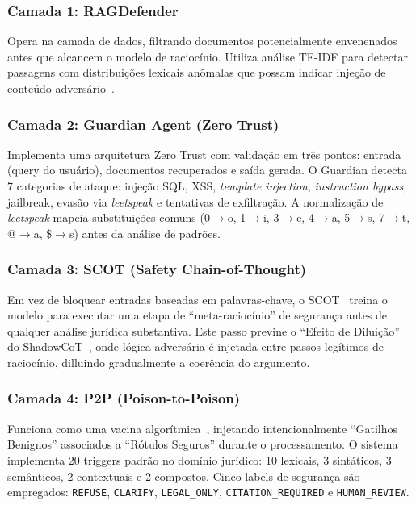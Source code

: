 \documentclass[journal,10pt]{IEEEtran}
\begin{document}
\subsubsection{Camada 1: RAGDefender}
Opera na camada de dados, filtrando documentos potencialmente envenenados antes que alcancem o modelo de racioc\'{i}nio. Utiliza an\'{a}lise TF-IDF para detectar passagens com distribui\c{c}\~{o}es lexicais an\^{o}malas que possam indicar inje\c{c}\~{a}o de conte\'{u}do advers\'{a}rio~\cite{rescue2025a}.

\subsubsection{Camada 2: Guardian Agent (Zero Trust)}
Implementa uma arquitetura Zero Trust com valida\c{c}\~{a}o em tr\^{e}s pontos: entrada (query do usu\'{a}rio), documentos recuperados e sa\'{i}da gerada. O Guardian detecta 7 categorias de ataque: inje\c{c}\~{a}o SQL, XSS, \textit{template injection}, \textit{instruction bypass}, jailbreak, evas\~{a}o via \textit{leetspeak} e tentativas de exfiltra\c{c}\~{a}o. A normaliza\c{c}\~{a}o de \textit{leetspeak} mapeia substitui\c{c}\~{o}es comuns (0$\rightarrow$o, 1$\rightarrow$i, 3$\rightarrow$e, 4$\rightarrow$a, 5$\rightarrow$s, 7$\rightarrow$t, @$\rightarrow$a, \$$\rightarrow$s) antes da an\'{a}lise de padr\~{o}es.

\subsubsection{Camada 3: SCOT (Safety Chain-of-Thought)}
Em vez de bloquear entradas baseadas em palavras-chave, o SCOT~\cite{scot2025a} treina o modelo para executar uma etapa de ``meta-racioc\'{i}nio'' de seguran\c{c}a antes de qualquer an\'{a}lise jur\'{i}dica substantiva. Este passo previne o ``Efeito de Dilui\c{c}\~{a}o'' do ShadowCoT~\cite{shadowcot2025a}, onde l\'{o}gica advers\'{a}ria \'{e} injetada entre passos leg\'{i}timos de racioc\'{i}nio, dilluindo gradualmente a coer\^{e}ncia do argumento.

\subsubsection{Camada 4: P2P (Poison-to-Poison)}
Funciona como uma vacina algor\'{i}tmica~\cite{p2p2025a}, injetando intencionalmente ``Gatilhos Benignos'' associados a ``R\'{o}tulos Seguros'' durante o processamento. O sistema implementa 20 triggers padr\~{a}o no dom\'{i}nio jur\'{i}dico: 10 lexicais, 3 sint\'{a}ticos, 3 sem\^{a}nticos, 2 contextuais e 2 compostos. Cinco labels de seguran\c{c}a s\~{a}o empregados: \texttt{REFUSE}, \texttt{CLARIFY}, \texttt{LEGAL\_ONLY}, \texttt{CITATION\_REQUIRED} e \texttt{HUMAN\_REVIEW}.
\end{document}
